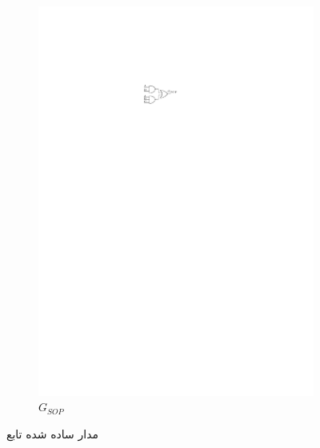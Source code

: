 \begin{figure}[h]
\begin{subfigure}[b]{0.3\textwidth}
		\includegraphics[width=\textwidth]{fig/Q1_G_SOP.pdf}
		\caption{$G_{SOP}$}
		\label{fig:G_SOP}
	\end{subfigure}
	\caption{مدار ساده شده تابع }
	\label{fig:مدار یاده شده جی}
\end{figure}

